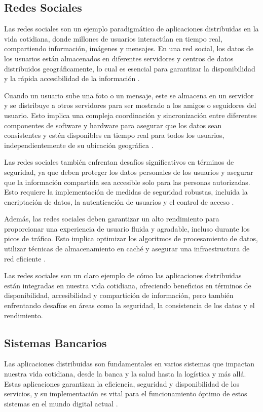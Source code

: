 \subsection{Redes Sociales}
\noindent
Las redes sociales son un ejemplo paradigmático de aplicaciones distribuidas en la vida cotidiana, donde millones de usuarios interactúan en tiempo real, compartiendo información, imágenes y mensajes. En una red social, los datos de los usuarios están almacenados en diferentes servidores y centros de datos distribuidos geográficamente, lo cual es esencial para garantizar la disponibilidad y la rápida accesibilidad de la información \cite{Zeng2012distributed}.

Cuando un usuario sube una foto o un mensaje, este se almacena en un servidor y se distribuye a otros servidores para ser mostrado a los amigos o seguidores del usuario. Esto implica una compleja coordinación y sincronización entre diferentes componentes de software y hardware para asegurar que los datos sean consistentes y estén disponibles en tiempo real para todos los usuarios, independientemente de su ubicación geográfica \cite{Fischer2023}.

Las redes sociales también enfrentan desafíos significativos en términos de seguridad, ya que deben proteger los datos personales de los usuarios y asegurar que la información compartida sea accesible solo para las personas autorizadas. Esto requiere la implementación de medidas de seguridad robustas, incluida la encriptación de datos, la autenticación de usuarios y el control de acceso \cite{Almadani2023,Fischer2023}.

Además, las redes sociales deben garantizar un alto rendimiento para proporcionar una experiencia de usuario fluida y agradable, incluso durante los picos de tráfico. Esto implica optimizar los algoritmos de procesamiento de datos, utilizar técnicas de almacenamiento en caché y asegurar una infraestructura de red eficiente \cite{Fischer2023}.

\begin{tcolorbox}[colback=yellow!10!white, colframe=green!50!black, title=Resumiendo]
	Las redes sociales son un claro ejemplo de cómo las aplicaciones distribuidas están integradas en nuestra vida cotidiana, ofreciendo beneficios en términos de disponibilidad, accesibilidad y compartición de información, pero también enfrentando desafíos en áreas como la seguridad, la consistencia de los datos y el rendimiento.
\end{tcolorbox}

\subsection{Sistemas Bancarios}
\noindent
Las aplicaciones distribuidas son fundamentales en varios sistemas que impactan nuestra vida cotidiana, desde la banca y la salud hasta la logística y más allá. Estas aplicaciones garantizan la eficiencia, seguridad y disponibilidad de los servicios, y su implementación es vital para el funcionamiento óptimo de estos sistemas en el mundo digital actual \cite{Almadani2023}.

